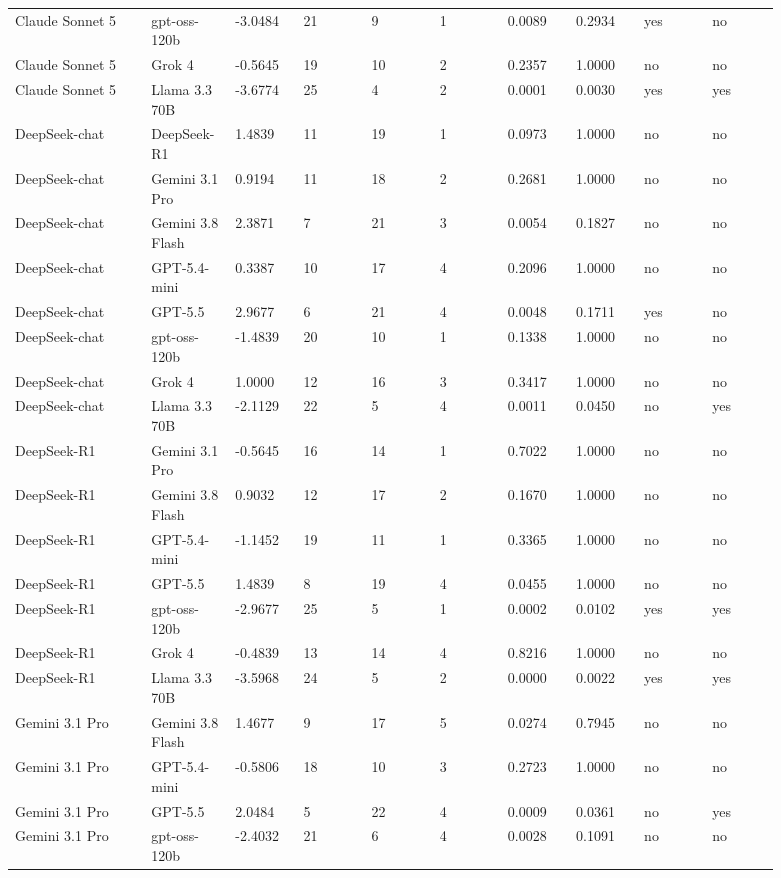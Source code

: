 \begin{landscape}
\begin{longtable}{p{0.162\linewidth}p{0.081\linewidth}p{0.081\linewidth}p{0.081\linewidth}p{0.081\linewidth}p{0.081\linewidth}p{0.081\linewidth}p{0.081\linewidth}p{0.081\linewidth}p{0.081\linewidth}}
Claude Sonnet 5 & gpt-oss-120b & -3.0484 & 21 & 9 & 1 & 0.0089 & 0.2934 & yes & no \\
Claude Sonnet 5 & Grok 4 & -0.5645 & 19 & 10 & 2 & 0.2357 & 1.0000 & no & no \\
Claude Sonnet 5 & Llama 3.3 70B & -3.6774 & 25 & 4 & 2 & 0.0001 & 0.0030 & yes & yes \\
DeepSeek-chat & DeepSeek-R1 & 1.4839 & 11 & 19 & 1 & 0.0973 & 1.0000 & no & no \\
DeepSeek-chat & Gemini 3.1 Pro & 0.9194 & 11 & 18 & 2 & 0.2681 & 1.0000 & no & no \\
DeepSeek-chat & Gemini 3.8 Flash & 2.3871 & 7 & 21 & 3 & 0.0054 & 0.1827 & no & no \\
DeepSeek-chat & GPT-5.4-mini & 0.3387 & 10 & 17 & 4 & 0.2096 & 1.0000 & no & no \\
DeepSeek-chat & GPT-5.5 & 2.9677 & 6 & 21 & 4 & 0.0048 & 0.1711 & yes & no \\
DeepSeek-chat & gpt-oss-120b & -1.4839 & 20 & 10 & 1 & 0.1338 & 1.0000 & no & no \\
DeepSeek-chat & Grok 4 & 1.0000 & 12 & 16 & 3 & 0.3417 & 1.0000 & no & no \\
DeepSeek-chat & Llama 3.3 70B & -2.1129 & 22 & 5 & 4 & 0.0011 & 0.0450 & no & yes \\
DeepSeek-R1 & Gemini 3.1 Pro & -0.5645 & 16 & 14 & 1 & 0.7022 & 1.0000 & no & no \\
DeepSeek-R1 & Gemini 3.8 Flash & 0.9032 & 12 & 17 & 2 & 0.1670 & 1.0000 & no & no \\
DeepSeek-R1 & GPT-5.4-mini & -1.1452 & 19 & 11 & 1 & 0.3365 & 1.0000 & no & no \\
DeepSeek-R1 & GPT-5.5 & 1.4839 & 8 & 19 & 4 & 0.0455 & 1.0000 & no & no \\
DeepSeek-R1 & gpt-oss-120b & -2.9677 & 25 & 5 & 1 & 0.0002 & 0.0102 & yes & yes \\
DeepSeek-R1 & Grok 4 & -0.4839 & 13 & 14 & 4 & 0.8216 & 1.0000 & no & no \\
DeepSeek-R1 & Llama 3.3 70B & -3.5968 & 24 & 5 & 2 & 0.0000 & 0.0022 & yes & yes \\
Gemini 3.1 Pro & Gemini 3.8 Flash & 1.4677 & 9 & 17 & 5 & 0.0274 & 0.7945 & no & no \\
Gemini 3.1 Pro & GPT-5.4-mini & -0.5806 & 18 & 10 & 3 & 0.2723 & 1.0000 & no & no \\
Gemini 3.1 Pro & GPT-5.5 & 2.0484 & 5 & 22 & 4 & 0.0009 & 0.0361 & no & yes \\
Gemini 3.1 Pro & gpt-oss-120b & -2.4032 & 21 & 6 & 4 & 0.0028 & 0.1091 & no & no \\

\end{longtable}
\end{landscape}
